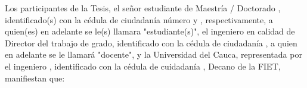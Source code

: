 Los participantes de la Tesis, el señor estudiante de Maestría / Doctorado \underline{\hspace{10ex}} \underline{\hspace{20ex}}, identificado(s) con la cédula de ciudadanía número \underline{\hspace{11ex}} y \underline{\hspace{11ex}}, respectivamente, a quien(es) en adelante se le(s) llamara "estudiante(s)", el ingeniero \underline{\hspace{20ex}} en calidad de Director del trabajo de grado, identificado con la cédula de ciudadanía \underline{\hspace{12ex}}, a quien en adelante se le llamará "docente", y la Universidad del Cauca, representada por el ingeniero \underline{\hspace{20ex}}, identificado con la cédula de cuidadanía \underline{\hspace{10ex}}, Decano de la FIET, manifiestan que:

